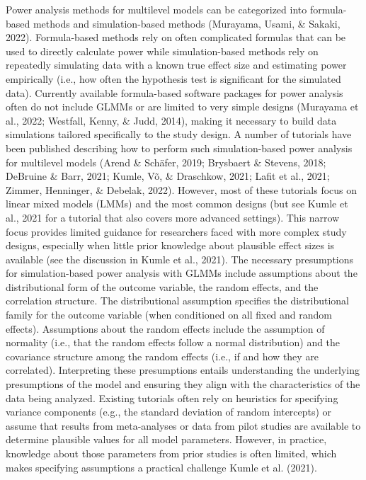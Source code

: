 \documentclass[
  man,floatsintext]{apa6}
\begin{document}
Power analysis methods for multilevel models can be categorized into formula-based methods and simulation-based methods (Murayama, Usami, \& Sakaki, 2022).
Formula-based methods rely on often complicated formulas that can be used to directly calculate power while simulation-based methods rely on repeatedly simulating data with a known true effect size and estimating power empirically (i.e., how often the hypothesis test is significant for the simulated data).
Currently available formula-based software packages for power analysis often do not include GLMMs or are limited to very simple designs (Murayama et al., 2022; Westfall, Kenny, \& Judd, 2014), making it necessary to build data simulations tailored specifically to the study design.
A number of tutorials have been published describing how to perform such simulation-based power analysis for multilevel models (Arend \& Schäfer, 2019; Brysbaert \& Stevens, 2018; DeBruine \& Barr, 2021; Kumle, Võ, \& Draschkow, 2021; Lafit et al., 2021; Zimmer, Henninger, \& Debelak, 2022).
However, most of these tutorials focus on linear mixed models (LMMs) and the most common designs (but see Kumle et al., 2021 for a tutorial that also covers more advanced settings). This narrow focus provides limited guidance for researchers faced with more complex study designs, especially when little prior knowledge about plausible effect sizes is available (see the discussion in Kumle et al., 2021).
The necessary presumptions for simulation-based power analysis with GLMMs include assumptions about the distributional form of the outcome variable, the random effects, and the correlation structure. The distributional assumption specifies the distributional family for the outcome variable (when conditioned on all fixed and random effects). Assumptions about the random effects include the assumption of normality (i.e., that the random effects follow a normal distribution) and the covariance structure among the random effects (i.e., if and how they are correlated). Interpreting these presumptions entails understanding the underlying presumptions of the model and ensuring they align with the characteristics of the data being analyzed.
Existing tutorials often rely on heuristics for specifying variance components (e.g., the standard deviation of random intercepts) or assume that results from meta-analyses or data from pilot studies are available to determine plausible values for all model parameters. However, in practice, knowledge about those parameters from prior studies is often limited, which makes specifying assumptions a practical challenge Kumle et al. (2021).
\end{document}
